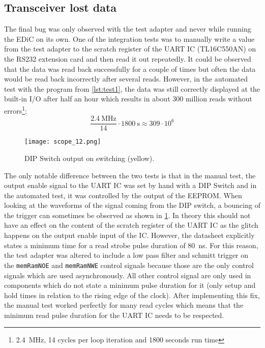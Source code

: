 \subsection{ Transceiver lost data}
The final bug was only observed with the test adapter and never while running the \gls{EDiC} on its own.
One of the integration tests was to manually write a value from the test adapter to the scratch register of the \gls{UART} \gls{IC} (TL16C550AN) on the RS232 extension card and then read it out repeatedly.
It could be observed that the data was read back successfully for a couple of times but often the data would be read back incorrectly after several reads.
However, in the automated test with the program from \cref{lst:test1}, the data was still correctly displayed at the built-in I/O after half an hour which results in about 300 million reads without errors\footnote{\qty{2.4}{\mega\hertz}, 14 cycles per loop iteration and 1800 seconds run time}:
\begin{equation}
  \frac{\qty{2.4}{\mega\hertz}}{14}\cdot\qty{1800}{\second}\approx 309\cdot 10^6
\end{equation}

\begin{figure}[t]
  \texttt{[image: scope\_12.png]}
  \caption{DIP Switch output on switching (yellow).}
  \label{fig:bounce}
\end{figure}
The only notable difference between the two tests is that in the manual test, the output enable signal to the \gls{UART} \gls{IC} was set by hand with a DIP Switch and in the automated test, it was controlled by the output of the \gls{EEPROM}.
When looking at the waveforms of the signal coming from the DIP switch, a bouncing of the trigger can sometimes be observed as shown in \cref{fig:bounce}.
In theory this should not have an effect on the content of the scratch register of the \gls{UART} \gls{IC} as the glitch happens on the output enable input of the \gls{IC}.
However, the datasheet explicitly states a minimum time for a read strobe pulse duration of \qty{80}{\nano\second}.
For this reason, the test adapter was altered to include a low pass filter and schmitt trigger on the \texttt{memRamNOE} and \texttt{memRamNWE} control signals because those are the only control signals which are used asynchronously.
All other control signal are only used in components which do not state a minimum pulse duration for it (only setup and hold times in relation to the rising edge of the clock).
After implementing this fix, the manual test worked perfectly for many read cycles which means that the minimum read pulse duration for the \gls{UART} \gls{IC} needs to be respected.

